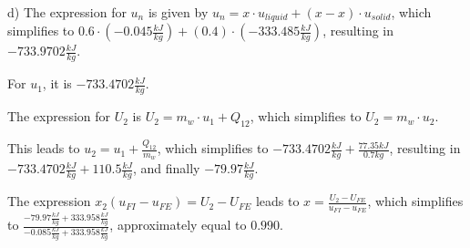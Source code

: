 d) The expression for \( u_n \) is given by \( u_n = x \cdot u_{liquid} + (x - x) \cdot u_{solid} \), which simplifies to \( 0.6 \cdot (-0.045 \frac{kJ}{kg}) + (0.4) \cdot (-333.485 \frac{kJ}{kg}) \), resulting in \( -733.9702 \frac{kJ}{kg} \).

For \( u_1 \), it is \( -733.4702 \frac{kJ}{kg} \).

The expression for \( U_2 \) is \( U_2 = m_w \cdot u_1 + Q_{12} \), which simplifies to \( U_2 = m_w \cdot u_2 \).

This leads to \( u_2 = u_1 + \frac{Q_{12}}{m_w} \), which simplifies to \( -733.4702 \frac{kJ}{kg} + \frac{77.35 kJ}{0.7 kg} \), resulting in \( -733.4702 \frac{kJ}{kg} + 110.5 \frac{kJ}{kg} \), and finally \( -79.97 \frac{kJ}{kg} \).

The expression \( x_2 (u_{FI} - u_{FE}) = U_2 - U_{FE} \) leads to \( x = \frac{U_2 - U_{FE}}{u_{FI} - u_{FE}} \), which simplifies to \( \frac{-79.97 \frac{kJ}{kg} + 333.958 \frac{kJ}{kg}}{-0.085 \frac{kJ}{kg} + 333.958 \frac{kJ}{kg}} \), approximately equal to \( 0.990 \).
